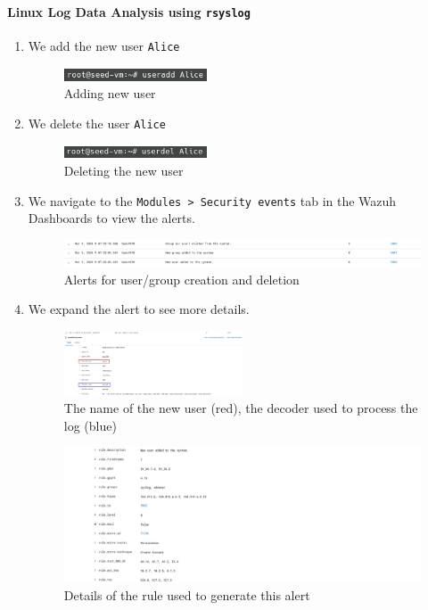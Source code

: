 \paragraph{Linux Log Data Analysis using \texttt{rsyslog}}
\begin{enumerate}
    \item We add the new user \texttt{Alice}
    \begin{figure} [H]
    \centering
    \includegraphics[width=0.4\textwidth]{images/log-data/7.png}
    \caption{Adding new user}
    \end{figure}
    \item We delete the user \texttt{Alice}
    \begin{figure} [H]
    \centering
    \includegraphics[width=0.4\textwidth]{images/log-data/8.png}
    \caption{Deleting the new user}
    \end{figure}
    \item We navigate to the \texttt{Modules > Security events} tab in the Wazuh Dashboards to view the alerts. 
    \begin{figure} [H]
    \centering
    \includegraphics[width=\textwidth]{images/log-data/4.png}
    \caption{Alerts for user/group creation and deletion}
    \end{figure}
    \item We expand the alert to see more details.
    \begin{figure} [H]
    \centering
    \includegraphics[width=0.5\textwidth]{images/log-data/5.png}
    \caption{The name of the new user (red), the decoder used to process the log (blue)}
    \end{figure}
    \begin{figure} [H]
    \centering
    \includegraphics[width=\textwidth]{images/log-data/6.png}
    \caption{Details of the rule used to generate this alert}
    \end{figure}
\end{enumerate}


